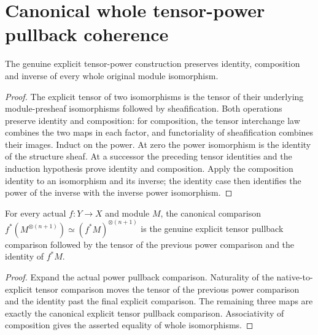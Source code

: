 \section{Canonical whole tensor-power pullback coherence}

\begin{lemma}\label{lem:actual-power-iso-functoriality}
\leanok
{}
The genuine explicit tensor-power construction preserves identity,
composition and inverse of every whole original module isomorphism.
\end{lemma}
\begin{proof}
The explicit tensor of two isomorphisms is the tensor of their
underlying module-presheaf isomorphisms followed by sheafification.
Both operations preserve identity and composition: for composition,
the tensor interchange law combines the two maps in each factor,
and functoriality of sheafification combines their images. Induct
on the power. At zero the power isomorphism is the identity of the
structure sheaf. At a successor the preceding tensor identities
and the induction hypothesis prove identity and composition.
Apply the composition identity to an isomorphism and its inverse;
the identity case then identifies the power of the inverse with
the inverse power isomorphism.
\end{proof}

\begin{lemma}\label{lem:actual-power-pullback-successor}
\leanok
{}
For every actual $f:Y\to X$ and module $M$, the canonical comparison
$f^*(M^{\otimes(n+1)})\simeq(f^*M)^{\otimes(n+1)}$ is the genuine
explicit tensor pullback comparison followed by the tensor of the
previous power comparison and the identity of $f^*M$.
\end{lemma}
\begin{proof}
Expand the actual power pullback comparison. Naturality of the
native-to-explicit tensor comparison moves the tensor of the
previous power comparison and the identity past the final
explicit comparison. The remaining three maps are exactly the
canonical explicit tensor pullback comparison. Associativity of
composition gives the asserted equality of whole isomorphisms.
\end{proof}

